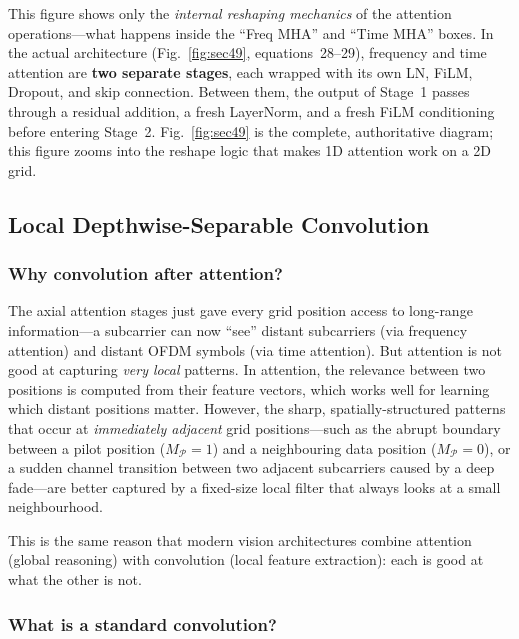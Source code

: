 \documentclass[11pt,a4paper]{article}
\begin{document}
	\begin{warning}
		This figure shows only the \emph{internal reshaping mechanics} of the attention operations---what happens inside the ``Freq MHA'' and ``Time MHA'' boxes.  In the actual architecture (Fig.~\ref{fig:sec49}, equations~28--29), frequency and time attention are \textbf{two separate stages}, each wrapped with its own LN, FiLM, Dropout, and skip connection.  Between them, the output of Stage~1 passes through a residual addition, a fresh LayerNorm, and a fresh FiLM conditioning before entering Stage~2.  Fig.~\ref{fig:sec49} is the complete, authoritative diagram; this figure zooms into the reshape logic that makes 1D attention work on a 2D grid.
	\end{warning}
	
	\subsection{Local Depthwise-Separable Convolution}
	
	\subsubsection*{Why convolution after attention?}
	
	The axial attention stages just gave every grid position access to long-range information---a subcarrier can now ``see'' distant subcarriers (via frequency attention) and distant OFDM symbols (via time attention).  But attention is not good at capturing \emph{very local} patterns.  In attention, the relevance between two positions is computed from their feature vectors, which works well for learning which distant positions matter.  However, the sharp, spatially-structured patterns that occur at \emph{immediately adjacent} grid positions---such as the abrupt boundary between a pilot position ($M_\mathcal{P}\!=\!1$) and a neighbouring data position ($M_\mathcal{P}\!=\!0$), or a sudden channel transition between two adjacent subcarriers caused by a deep fade---are better captured by a fixed-size local filter that always looks at a small neighbourhood.
	
	This is the same reason that modern vision architectures combine attention (global reasoning) with convolution (local feature extraction): each is good at what the other is not.
	
	\subsubsection*{What is a standard convolution?}
	
\end{document}
